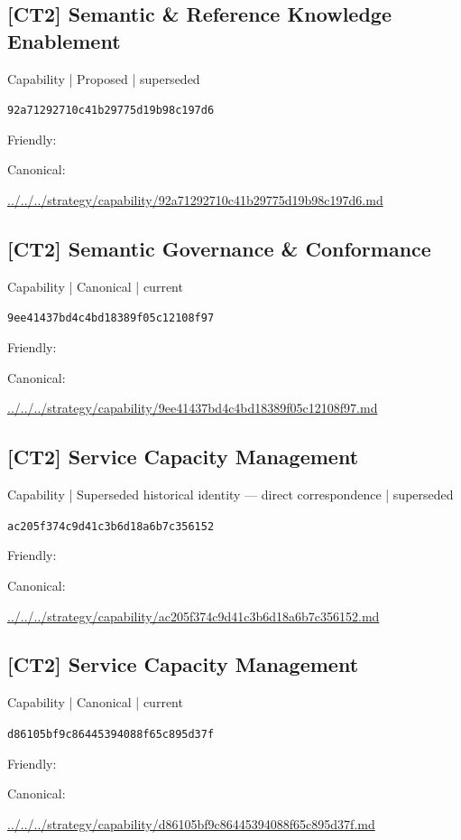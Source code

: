 \documentclass[10pt,a4paper]{article}
\begin{document}
\subsection*{[CT2] Semantic \& Reference Knowledge Enablement}
{\small Capability | Proposed | superseded}\par
\texttt{92a71292710c41b29775d19b98c197d6}\par
Friendly: \par
Canonical: \par
{\footnotesize\url{../../../strategy/capability/92a71292710c41b29775d19b98c197d6.md}}\par
\subsection*{[CT2] Semantic Governance \& Conformance}
{\small Capability | Canonical | current}\par
\texttt{9ee41437bd4c4bd18389f05c12108f97}\par
Friendly: \par
Canonical: \par
{\footnotesize\url{../../../strategy/capability/9ee41437bd4c4bd18389f05c12108f97.md}}\par
\subsection*{[CT2] Service Capacity Management}
{\small Capability | Superseded historical identity — direct correspondence | superseded}\par
\texttt{ac205f374c9d41c3b6d18a6b7c356152}\par
Friendly: \par
Canonical: \par
{\footnotesize\url{../../../strategy/capability/ac205f374c9d41c3b6d18a6b7c356152.md}}\par
\subsection*{[CT2] Service Capacity Management}
{\small Capability | Canonical | current}\par
\texttt{d86105bf9c86445394088f65c895d37f}\par
Friendly: \par
Canonical: \par
{\footnotesize\url{../../../strategy/capability/d86105bf9c86445394088f65c895d37f.md}}\par
\end{document}
